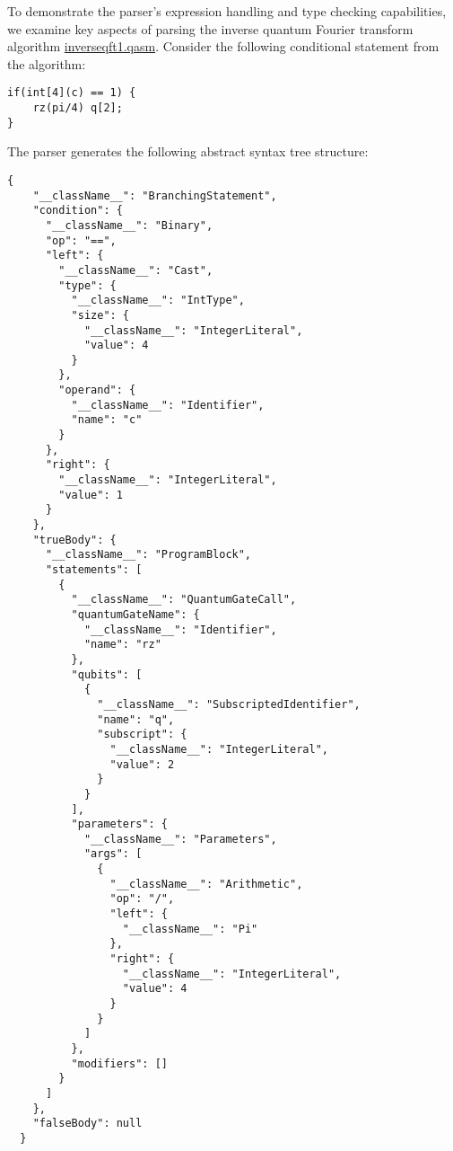 \documentclass{article}
\begin{document}
To demonstrate the parser's expression handling and type checking capabilities, we examine key aspects of parsing the inverse quantum Fourier transform algorithm \href{https://github.com/openqasm/openqasm/blob/main/examples/inverseqft1.qasm}{inverseqft1.qasm}. Consider the following conditional statement from the algorithm: 

\begin{lstlisting}
if(int[4](c) == 1) { 
    rz(pi/4) q[2]; 
}
\end{lstlisting}

The parser generates the following abstract syntax tree structure:

\break

\begin{lstlisting}
{
    "__className__": "BranchingStatement",
    "condition": {
      "__className__": "Binary",
      "op": "==",
      "left": {
        "__className__": "Cast",
        "type": {
          "__className__": "IntType",
          "size": {
            "__className__": "IntegerLiteral",
            "value": 4
          }
        },
        "operand": {
          "__className__": "Identifier",
          "name": "c"
        }
      },
      "right": {
        "__className__": "IntegerLiteral",
        "value": 1
      }
    },
    "trueBody": {
      "__className__": "ProgramBlock",
      "statements": [
        {
          "__className__": "QuantumGateCall",
          "quantumGateName": {
            "__className__": "Identifier",
            "name": "rz"
          },
          "qubits": [
            {
              "__className__": "SubscriptedIdentifier",
              "name": "q",
              "subscript": {
                "__className__": "IntegerLiteral",
                "value": 2
              }
            }
          ],
          "parameters": {
            "__className__": "Parameters",
            "args": [
              {
                "__className__": "Arithmetic",
                "op": "/",
                "left": {
                  "__className__": "Pi"
                },
                "right": {
                  "__className__": "IntegerLiteral",
                  "value": 4
                }
              }
            ]
          },
          "modifiers": []
        }
      ]
    },
    "falseBody": null
  }
\end{lstlisting}
\end{document}
